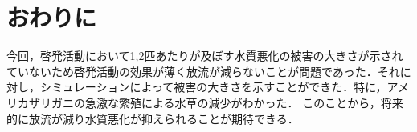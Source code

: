 \documentclass[twocolumn,10pt,a4j]{ltjsarticle}
\begin{document}



\section{おわりに}
今回，啓発活動において1,2匹あたりが及ぼす水質悪化の被害の大きさが示されていないため啓発活動の効果が薄く放流が減らないことが問題であった．それに対し，シミュレーションによって被害の大きさを示すことができた．特に，アメリカザリガニの急激な繁殖による水草の減少がわかった．
このことから，将来的に放流が減り水質悪化が抑えられることが期待できる．
\end{document}

